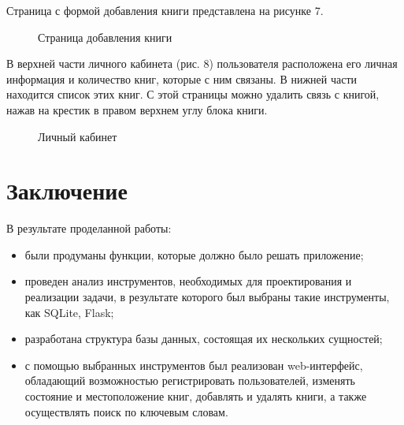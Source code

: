 Страница с формой добавления книги представлена на рисунке 7. 

\begin{figure}[H]
\caption{Страница добавления книги}
\label{fig:image}
\end{figure}

В верхней части личного кабинета (рис. 8) пользователя расположена его личная информация  и количество книг, которые с ним связаны. В нижней части находится список этих книг. С этой страницы можно удалить связь с книгой, нажав на крестик в правом верхнем углу блока книги.

\begin{figure}[H]
\caption{Личный кабинет}
\label{fig:image}
\end{figure}

\newpage
\section*{Заключение}%

В результате проделанной работы:
\begin{itemize}
	\item были продуманы функции, которые должно было решать приложение;
	\item проведен анализ инструментов, необходимых для проектирования и реализации задачи, в результате которого был выбраны такие инструменты, как SQLite, Flask;
	\item разработана структура базы данных, состоящая их нескольких сущностей;
	\item с помощью выбранных инструментов был реализован web-интерфейс, обладающий возможностью регистрировать пользователей, изменять состояние и местоположение книг, добавлять и удалять книги, а также осуществлять поиск по ключевым словам.
\end{itemize}



















